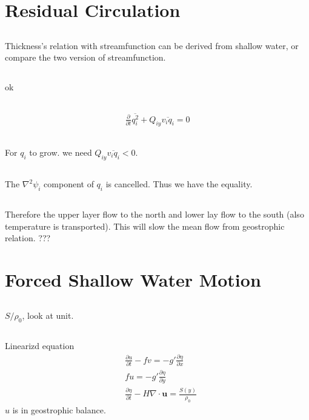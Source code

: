 \documentclass[11pt,letterpaper]{book}
\theoremstyle{definition}
\newcommand{\pe}{\partial}
\newcommand{\ve}[1]{\boldsymbol{#1}}
\begin{document}
\section{Residual Circulation}
\subsection{}
Thickness's relation with streamfunction can be derived from shallow water, or compare the two version of streamfunction.

\subsection{}
ok

\subsection{}
\begin{align*}
    \frac{\pe}{\pe t}\overline{q_i^2}+Q_{iy}\overline{v_iq_i} = 0
\end{align*}

\subsection{}
For $q_i$ to grow. we need $Q_{iy}\overline{v_iq_i}<0$.

\subsection{}
The $\nabla^2\psi_i$ component of $q_i$ is cancelled. Thus we have the equality.

\subsection{}
Therefore the upper layer flow to the north and lower lay flow to the south (also temperature is transported). This will slow the mean flow from geostrophic relation. ???

\section{Forced Shallow Water Motion}
\subsection{}
$S/\rho_0$, look at unit.

\subsection{}
Linearizd equation
\begin{align*}
    & \frac{\pe u}{\pe t}-fv = -g'\frac{\pe \eta}{\pe x}\\
    & fu = -g'\frac{\pe \eta}{\pe y}\\
    & \frac{\pe \eta}{\pe t}-H\nabla\cdot \ve u = \frac{S(y)}{\rho_0}
\end{align*}
$u$ is in geostrophic balance.
\end{document}
